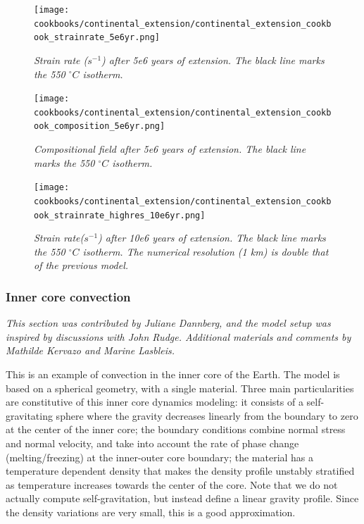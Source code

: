\documentclass{article}
\begin{document}
\begin{figure}
\centering
\texttt{[image: cookbooks/continental\_extension/continental\_extension\_cookbook\_strainrate\_5e6yr.png]}
\caption{\it Strain rate ($s^{-1}$) after 5e6 years of extension. The black line marks the 550 $^\circ C$ isotherm.} 
\label{fig:continental_extension_cookbook_strainrate_5e6yr}
\end{figure}
\begin{figure}
\texttt{[image: cookbooks/continental\_extension/continental\_extension\_cookbook\_composition\_5e6yr.png]}
\caption{\it Compositional field after 5e6 years of extension. The black line marks the 550 $^\circ C$ isotherm.} 
\label{fig:continental_extension_cookbook_composition_5e6yr}
\end{figure}
\begin{figure}
\texttt{[image: cookbooks/continental\_extension/continental\_extension\_cookbook\_strainrate\_highres\_10e6yr.png]}
\caption{\it Strain rate($s^{-1}$) after 10e6 years of extension. The black line marks the 550 $^\circ C$ isotherm. The numerical resolution (1 km) is double that of the previous model.} 
\label{fig:continental_extension_cookbook_strainrate_highres_10e6yr}
\end{figure}
 
\subsubsection{Inner core convection}
\label{sec:cookbooks-inner-core-convection}

\textit{This section was contributed by Juliane Dannberg, and the model setup was inspired 
by discussions with John Rudge. Additional materials and comments by Mathilde Kervazo and Marine Lasbleis.}

This is an example of convection in the inner core of the Earth. The model is based on a spherical geometry, with a single material. Three main particularities are constitutive of this inner core dynamics modeling: it consists of a self-gravitating sphere where the gravity decreases linearly from the boundary to zero at the center of the inner core; the boundary conditions combine normal stress and normal velocity, and take into account the rate of phase change (melting/freezing) at the inner-outer core boundary; the material has a temperature dependent density that makes the density profile unstably stratified as temperature increases towards the center of the core.
Note that we do not actually compute self-gravitation, but instead define a linear gravity profile. Since the density variations are very small, this is a good approximation.
\end{document}

